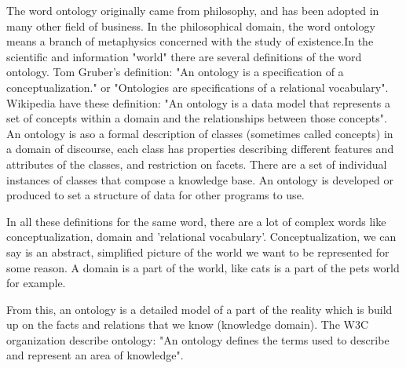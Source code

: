 The word ontology originally came from philosophy, and has been adopted in many other field of business. In the philosophical domain, the word ontology means a branch of metaphysics concerned with the study of existence.In the scientific and information "world" there are several definitions of the word ontology. Tom Gruber's definition: "An ontology is a specification of a conceptualization." or "Ontologies are specifications of a relational vocabulary". Wikipedia have these definition: "An ontology is a data model that represents a set of concepts within a domain and the relationships between those concepts".\cite{website:wikipediaontology} An ontology is aso a formal description of classes (sometimes called concepts) in a domain of discourse, each class has properties describing different features and attributes of the classes, and restriction on facets. There are a set of individual instances of classes that compose a knowledge base.\cite{website:standford} An ontology is developed or produced to set a structure of data for other programs to use.

In all these definitions for the same word, there are a lot of complex words like conceptualization, domain and 'relational vocabulary'. Conceptualization, we can say is an abstract, simplified picture of the world we want to be represented for some reason. A domain is a part of the world, like cats is a part of the pets world for example.

From this, an ontology is a detailed model of a part of the reality which is build up on the facts and relations that we know (knowledge domain). The W3C organization describe ontology: "An ontology defines the terms used to describe and represent an area of knowledge".\cite{website:whatontology}